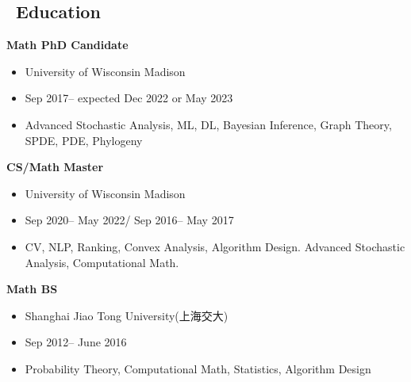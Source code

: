 \documentclass{resume}
\begin{document}
	
	\begin{spacing}{1.0}
		
		
		
		\vspace{-0.20in}
		\section{\faGraduationCap\ Education}
		\begin{minipage}[t]{0.33\textwidth}
			\Large\textbf{Math PhD Candidate}
			\small\begin{itemize}
				\item University of Wisconsin Madison
				\item Sep 2017-- expected Dec 2022 or May 2023
				\item Advanced Stochastic Analysis, ML, DL, Bayesian Inference, Graph Theory, SPDE, PDE, Phylogeny
			\end{itemize}
		\end{minipage}
		\begin{minipage}[t]{0.33\textwidth}
			\Large\textbf{CS/Math Master}
			\small\begin{itemize}
				\item University of Wisconsin Madison
				\item Sep 2020-- May 2022/ Sep 2016-- May 2017
				\item CV, NLP, Ranking, Convex Analysis, Algorithm Design. Advanced Stochastic Analysis, Computational Math.
			\end{itemize}
		\end{minipage}
		\begin{minipage}[t]{0.33\textwidth}
			\Large\textbf{Math BS}
			\small\begin{itemize}
				\item Shanghai Jiao Tong University(上海交大)
				\item Sep 2012-- June 2016
				\item Probability Theory, Computational Math, Statistics, Algorithm Design
			\end{itemize}
		\end{minipage}
		

\end{spacing}
\end{document}

